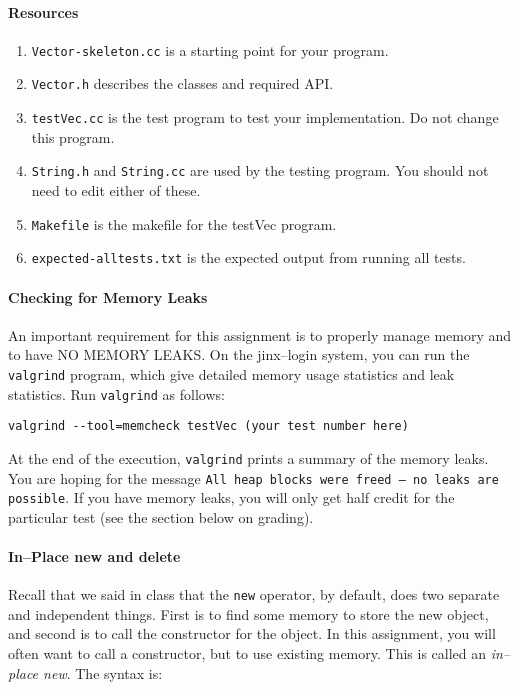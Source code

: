 \documentclass[10pt]{article}
\begin{document}
\paragraph{Resources}
\begin{enumerate}
\item {\tt Vector-skeleton.cc} is a starting point for your program.
\item {\tt Vector.h} describes the classes and required API.
\item {\tt testVec.cc} is the test program to test your implementation.  Do not change this program.
\item {\tt String.h} and {\tt String.cc} are used by the testing program.
You should not need to edit either of these.
\item {\tt Makefile} is the makefile for the testVec program.
\item {\tt expected-alltests.txt} is the expected output from running
all tests.
\end{enumerate}

\paragraph{Checking for Memory Leaks}
An important requirement for this assignment is to properly manage memory
and to have NO MEMORY LEAKS.  On the jinx--login system, you can run
the {\tt valgrind} program, which give detailed memory usage statistics
and leak statistics.  Run {\tt valgrind} as follows:

\begin{verbatim}
valgrind --tool=memcheck testVec (your test number here)
\end{verbatim}

At the end of the execution, {\tt valgrind} prints a summary of the
memory leaks.  You are hoping for the message
{\tt All heap blocks were freed -- no leaks are possible}.
If you have memory leaks, you will only get half credit for the particular
test (see the section below on grading).

\paragraph{In--Place new and delete}
Recall that we said in class that the {\tt new} operator, by default,
does two separate and independent things. First is to find some memory
to store the new object, and second is to call the constructor for
the object.  In this assignment, you will often want to call a constructor,
but to use existing memory.  This is called an {\em in--place new}.
The syntax is:
\end{document}
